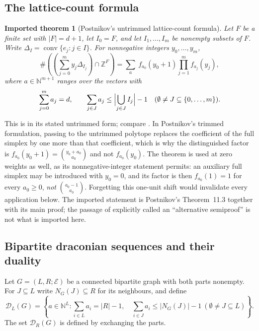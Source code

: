 \documentclass[11pt]{article}
\numberwithin{equation}{section}
\newtheorem{imported}[theorem]{Imported theorem}
\theoremstyle{definition}
\theoremstyle{remark}
\newcommand{\N}{\mathbb N}
\newcommand{\Z}{\mathbb Z}
\newcommand{\conv}{\operatorname{conv}}
\newcommand{\Dr}{\mathcal D}
\begin{document}
\subsection{The lattice-count formula}
\label{sec:imports-lattice}

\begin{imported}[Postnikov's untrimmed lattice-count formula]
\label{imp:lattice}
Let $F$ be a finite set with $|F|=d+1$, let $I_0=F$, and let
$I_1,\ldots,I_m$ be nonempty subsets of $F$. Write
$\Delta_I=\conv\{e_j:j\in I\}$. For nonnegative integers $y_0,\ldots,y_m$,
\begin{equation}
 \#\left(\left(\sum_{j=0}^{m}y_j\Delta_{I_j}\right)\cap\Z^{F}\right)
 =\sum_{a}\ f_{a_0}(y_0+1)\prod_{j=1}^{m}f_{a_j}(y_j),
 \label{eq:postnikov}
\end{equation}
where $a\in\N^{m+1}$ ranges over the vectors with
\begin{equation}
 \sum_{j=0}^{m}a_j=d,\qquad
 \sum_{j\in J}a_j\le\Bigl|\bigcup_{j\in J}I_j\Bigr|-1
 \quad(\emptyset\ne J\subseteq\{0,\ldots,m\}).
 \label{eq:draconian-conditions}
\end{equation}
\end{imported}

This is \cite[Theorem~11.3]{Postnikov} in its stated untrimmed form; compare
\cite[Theorem~2.1]{AC}. In Postnikov's trimmed formulation, passing to the
untrimmed polytope replaces the coefficient of the full simplex by one more
than that coefficient, which is why the distinguished factor is
$f_{a_0}(y_0+1)=\binom{y_0+a_0}{a_0}$ and not $f_{a_0}(y_0)$. The theorem is
used at zero weights as well, as its nonnegative-integer statement permits:
an auxiliary full simplex may be introduced with $y_0=0$, and its factor is
then $f_{a_0}(1)=1$ for every $a_0\ge0$, \emph{not} $\binom{a_0-1}{a_0}$.
Forgetting this one-unit shift would invalidate every application below.
The imported statement is Postnikov's Theorem~11.3 together with its main
proof; the passage of \cite{Postnikov} explicitly called an ``alternative
semiproof'' is not what is imported here.

\subsection{Bipartite draconian sequences and their duality}
\label{sec:imports-duality}

Let $G=(L,R;\mathcal E)$ be a connected bipartite graph with both parts
nonempty. For $J\subseteq L$ write $N_G(J)\subseteq R$ for its neighbours, and
define
\begin{equation}
 \Dr_L(G)=\left\{a\in\N^L:
 \sum_{i\in L}a_i=|R|-1,\quad
 \sum_{i\in J}a_i\le |N_G(J)|-1\ (\emptyset\ne J\subseteq L)\right\}.
 \label{eq:draconian}
\end{equation}
The set $\Dr_R(G)$ is defined by exchanging the parts.
\end{document}
